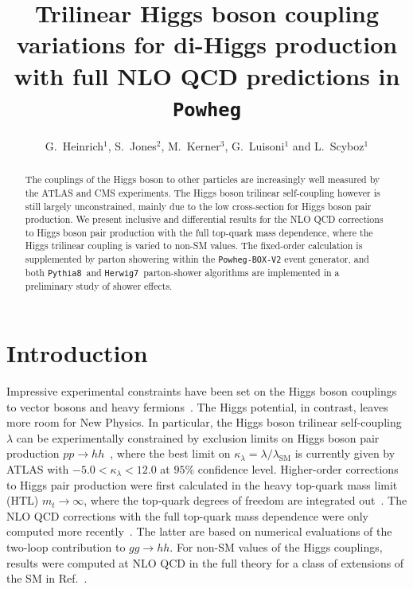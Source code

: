 \documentclass[a4paper]{jpconf}
\newcommand{\pythia}{\texttt{Pythia8}}
\newcommand{\herwig}{\texttt{Herwig7}}
\begin{document}
\title{Trilinear Higgs boson coupling variations for di-Higgs production with full NLO QCD predictions in \texttt{Powheg}}

\author{G.~Heinrich$^1$, S.~Jones$^2$, M.~Kerner$^3$, G.~Luisoni$^1$ and L.~Scyboz$^1$}

\address{$^1$ Max-Planck-Institut f\"ur Physik, F\"ohringer Ring 6, 80805 M\"unchen, Germany}
\address{$^2$ Theoretical Physics Department, CERN, Geneva, Switzerland}
\address{$^3$ Physik-Institut, Universit\"at Z\"urich, Winterthurerstrasse 190, 8057 Z\"urich, Switzerland}


\begin{abstract}
The couplings of the Higgs boson to other particles are increasingly well measured by the ATLAS and CMS experiments. The Higgs boson trilinear self-coupling however is still largely unconstrained,  mainly due to the low cross-section for Higgs boson pair production. We present inclusive and differential results for the NLO QCD corrections to Higgs boson pair production with the full top-quark mass dependence, where the Higgs trilinear coupling is varied to non-SM values. The fixed-order calculation is supplemented by parton showering within the \texttt{Powheg-BOX-V2} event generator, and both \pythia~and \herwig~parton-shower algorithms are implemented in a preliminary study of shower effects.
\end{abstract}


\section{Introduction}

Impressive experimental constraints have been set on the Higgs boson couplings to vector bosons and heavy fermions~\cite{Khachatryan:2016vau,Aaboud:2017vzb,Sirunyan:2018koj,Sirunyan:2018sgc}. The Higgs potential, in contrast, leaves more room for New Physics. In particular, the Higgs boson trilinear self-coupling $\lambda$ can be experimentally constrained by exclusion limits on Higgs boson pair production $pp \to hh$~\cite{Sirunyan:2018two,Aad:2019uzh}, where the best limit on $\kappa_{\lambda}=\lambda / \lambda_{\mathrm{SM}}$ is currently given by ATLAS with $-5.0 < \kappa_{\lambda} < 12.0$ at $95\%$ confidence level.
Higher-order corrections to Higgs pair production were first calculated in the heavy top-quark mass limit (HTL) $m_t \to \infty$, where the top-quark degrees of freedom are integrated out~\cite{Dawson:1998py,deFlorian:2013jea,Grigo:2014jma,deFlorian:2016uhr}. The NLO QCD corrections with the full top-quark mass dependence were only computed more recently~\cite{Borowka:2016ehy,Borowka:2016ypz,Baglio:2018lrj}. The latter are based on numerical evaluations of the two-loop contribution to $gg \to hh$. For non-SM values of the Higgs couplings, results were computed at NLO QCD in the full theory for a class of extensions of the SM in Ref.~\cite{Buchalla:2018yce}.
\end{document}
